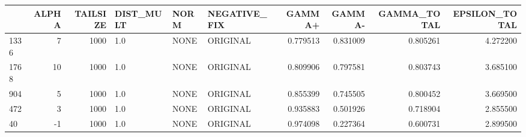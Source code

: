 \begin{tabular}{lrrlllrrrr}
\toprule
 & ALPHA & TAILSIZE & DIST_MULT & NORM & NEGATIVE_FIX & GAMMA+ & GAMMA- & GAMMA_TOTAL & EPSILON_TOTAL \\
\midrule
1336 & 7 & 1000 & 1.0 & NONE & ORIGINAL & 0.779513 & 0.831009 & 0.805261 & 4.272200 \\
1768 & 10 & 1000 & 1.0 & NONE & ORIGINAL & 0.809906 & 0.797581 & 0.803743 & 3.685100 \\
904 & 5 & 1000 & 1.0 & NONE & ORIGINAL & 0.855399 & 0.745505 & 0.800452 & 3.669500 \\
472 & 3 & 1000 & 1.0 & NONE & ORIGINAL & 0.935883 & 0.501926 & 0.718904 & 2.855500 \\
40 & -1 & 1000 & 1.0 & NONE & ORIGINAL & 0.974098 & 0.227364 & 0.600731 & 2.899500 \\
\bottomrule
\end{tabular}

